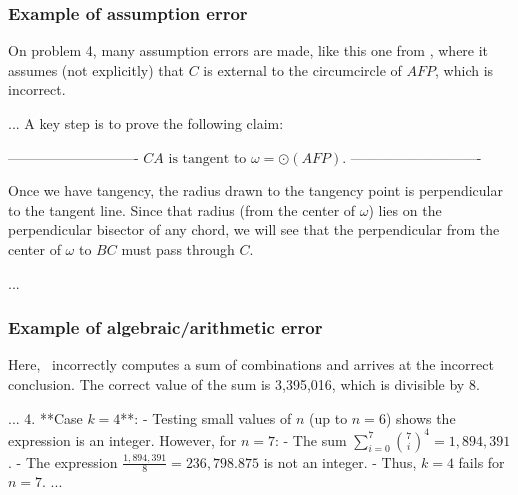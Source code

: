 \subsubsection{Example of assumption error}
On problem 4, many assumption errors are made, like this one from \othree, where it assumes (not explicitly) that $C$ is external to the circumcircle of $AFP$, which is incorrect.
\begin{gpt}{\othreeheader}
...
A key step is to prove the following claim:

----------------------------
$
\boxed{CA\text{ is tangent to } \omega=\odot(AFP).}
$
----------------------------

Once we have tangency, the radius drawn to the tangency point is perpendicular to the tangent line. Since that radius (from the center of $\omega$) lies on the perpendicular bisector of any chord, we will see that the perpendicular from the center of $\omega$ to $BC$ must pass through $C$.

...
\end{gpt}


\subsubsection{Example of algebraic/arithmetic error}
Here, \rone~incorrectly computes a sum of combinations and arrives at the incorrect conclusion. The correct value of the sum is 3,395,016, which is divisible by 8.

\begin{deepseekls}{\deepseekheader}
...
4. **Case $ k = 4 $**:
- Testing small values of $ n $ (up to $ n = 6 $) shows the expression is an integer. However, for $ n = 7 $:
    - The sum $ \sum_{i=0}^7 \binom{7}{i}^4 = 1,894,391 $.
    - The expression $ \frac{1,894,391}{8} = 236,798.875 $ is not an integer.
- Thus, $ k = 4 $ fails for $ n = 7 $.
...
\end{deepseekls}

